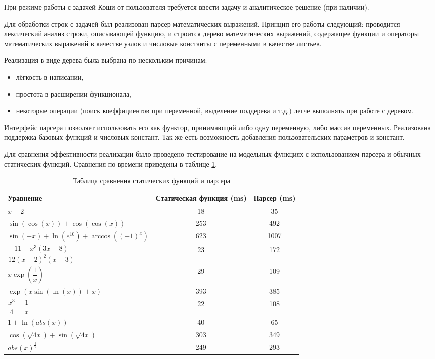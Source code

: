 При режиме работы с задачей Коши от пользователя требуется ввести задачу и аналитическое решение (при наличии). 

Для обработки строк с задачей был реализован парсер математических выражений. Принцип его работы следующий: проводится лексический
анализ строки, описывающей функцию, и строится дерево
математических выражений, содержащее функции и операторы математических выражений в качестве узлов
и числовые константы с переменными в качестве листьев.

Реализация в виде дерева была выбрана по нескольким причинам:

\begin{itemize}
    \item лёгкость в написании,
    \item простота в расширении функционала,
    \item некоторые операции (поиск коеффициентов при переменной, выделение поддерева и т.д.) легче выполнять при работе с деревом.
\end{itemize}

Интерфейс парсера позволяет использовать его как функтор, принимающий либо одну переменную, либо массив переменных. Реализована поддержка
базовых функций и числовых констант. Так же есть возможность добавления пользовательских параметров и констант.

Для сравнения эффективности реализации было проведено тестирование на модельных функциях с использованием парсера и обычных
статических функций. Сравнения по времени приведены в таблице \ref{tab:Banchmark}.

\begin{table}    
    \caption{Таблица сравнения статических функций и парсера}
    \begin{tabularx}{\textwidth}{|X|c|c|}
    \hline
    Уравнение & Статическая функция (ms) & Парсер (ms)\\
    \hline
    $x + 2$ & 18 & 35\\
    \hline
    $\sin(\cos(x)) + \cos(\cos(x))$ & 253 & 492\\
    \hline
    $\sin(-x) + \ln(e^{10}) + \arccos((-1)^x)$ & 623 & 1007\\
    \hline
    $\dfrac{11 - x^3 (3x - 8)}{12(x - 2)^2 (x - 3)}$ & 23 & 172\\
    \hline
    $x\exp(\dfrac{1}{x})$ & 29 & 109\\
    \hline
    $\exp(x\sin(\ln(x)) + x)$ & 393 & 385\\
    \hline
    $\dfrac{x^3}{4} - \dfrac{1}{x}$ & 22 & 108\\
    \hline
    $1 + \ln(abs(x))$ & 40 & 65\\
    \hline
    $\cos(\sqrt{4x}) + \sin(\sqrt{4x})$ & 303 & 349\\
    \hline
    $abs(x)^\frac{3}{2}$ & 249 & 293\\
    \hline
    \end{tabularx}
    \label{tab:Banchmark}
\end{table}

